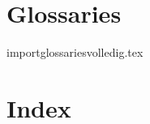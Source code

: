\documentclass[master=ucll,11pt,dutch,twoside]{kulemt}
\begin{document}

\chapter{Glossaries}

{importglossariesvolledig.tex}

\chapter{Index}

\printindex
\end{document}
